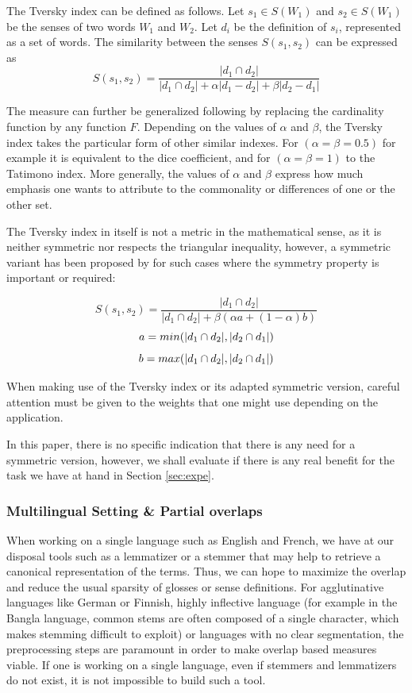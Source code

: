 \documentclass[10pt, a4paper]{article}
\begin{document}
The Tversky index can be defined as follows. Let \(s_1 \in S(W_1)\)  and \(s_2 \in S(W_1)\) be the senses of two words \(W_1\) and \(W_2\). Let \(d_i\) be the definition of \(s_i\), represented as a set of words. The similarity between the senses \(S(s_1, s_2)\) can be expressed as 
\[
S(s_1,s_2) = 
\frac{|d_1\cap d_2|}{|d_1\cap d_2| + \alpha |d_1-d_2| + \beta |d_2-d_1|}
\]

The measure can further be generalized following \cite{DBLP:conf/otm/PirroE10} by replacing the cardinality function by any function \(F\). Depending on the values of \(\alpha\) and \(\beta\), the Tversky index takes the particular form of other similar indexes. For \((\alpha=\beta=0.5)\) for example it is equivalent to the dice coefficient, and for  \((\alpha=\beta=1)\) to the Tatimono index. More generally, the values of \(\alpha\) and \(\beta\) express how much emphasis one wants to attribute to the commonality or differences of one or the other set.

 The Tversky index in itself is not a metric in the mathematical sense, as it is neither symmetric nor respects the triangular inequality, however, a symmetric variant has been proposed by \cite{Jimenez2010} for such cases where the symmetry property is important or required: 
 
 \[
 S(s_1,s_2) = \frac{|d_1\cap d_2|}{|d_1\cap d_2| + \beta (\alpha a + (1-\alpha)b)}\]
 \[
 a=min(|d_1\cap d_2|,|d_2\cap d_1|)\\
 \]\[
 b=max(|d_1\cap d_2|,|d_2\cap d_1|)\\ 
 \]
 
 When making use of the Tversky index or its adapted symmetric version, careful attention must be given to the weights that one might use depending on the application. 
 
 In this paper, there is no specific indication that there is any need for a symmetric version, however, we shall evaluate if there is any real benefit for the task we have at hand in Section \ref{sec:expe}. 

\subsubsection{Multilingual Setting \& Partial overlaps}
 When working on a single language such as English and French, we have at our disposal tools such as a lemmatizer or a stemmer that may help to retrieve a canonical representation of the terms. Thus, we can hope to maximize the overlap and reduce the usual sparsity of glosses or sense definitions. For agglutinative languages like German or Finnish, highly inflective language (for example in the Bangla language, common stems are often composed of a single character, which makes stemming difficult to exploit) or languages with no clear segmentation, the preprocessing steps are paramount in order to make overlap based measures viable. If one is working on a single language, even if stemmers and lemmatizers do not exist, it is not impossible to build such a tool.
\end{document}
